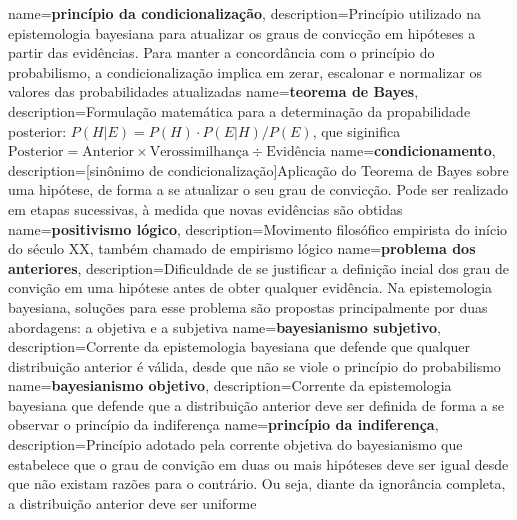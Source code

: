 {
    name=\textbf{princípio da condicionalização},
    description={Princípio utilizado na epistemologia bayesiana para atualizar os graus de convicção em hipóteses a partir das evidências. Para manter a concordância com o princípio do probabilismo, a condicionalização implica em zerar, escalonar e normalizar os valores das probabilidades atualizadas}
}
{
    name=\textbf{teorema de Bayes},
    description={Formulação matemática para a determinação da propabilidade posterior: $P(H | E) = P(H) \cdot P(E | H) / P(E)$, que siginifica $\text{Posterior} = \text{Anterior} \times \text{Verossimilhança} \div \text{Evidência}$}
}
{
    name=\textbf{condicionamento},
    description={[sinônimo de condicionalização]Aplicação do Teorema de Bayes sobre uma hipótese, de forma a se atualizar o seu grau de convicção. Pode ser realizado em etapas sucessivas, à medida que novas evidências são obtidas}
}
{
    name=\textbf{positivismo lógico},
    description={Movimento filosófico empirista do início do século XX, também chamado de empirismo lógico}
}
{
    name=\textbf{problema dos anteriores},
    description={Dificuldade de se justificar a definição incial dos grau de convição em uma hipótese antes de obter qualquer evidência. Na epistemologia bayesiana, soluções para esse problema são propostas principalmente por duas abordagens: a objetiva e a subjetiva}
}
{
    name=\textbf{bayesianismo subjetivo},
    description={Corrente da epistemologia bayesiana que defende que qualquer distribuição anterior é válida, desde que não se viole o princípio do probabilismo}
}
{
    name=\textbf{bayesianismo objetivo},
    description={Corrente da epistemologia bayesiana que defende que a distribuição anterior deve ser definida de forma a se observar o princípio da indiferença}
}
{
    name=\textbf{princípio da indiferença},
    description={Princípio adotado pela corrente objetiva do bayesianismo que estabelece que o grau de convição em duas ou mais hipóteses deve ser igual desde que não existam razões para o contrário. Ou seja, diante da ignorância completa, a distribuição anterior deve ser uniforme}
}
